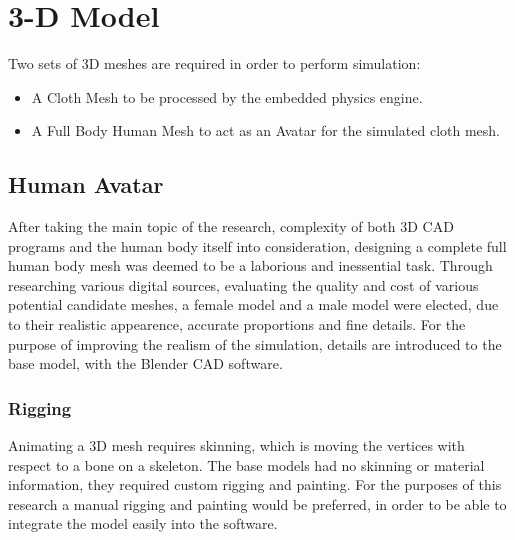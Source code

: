 \chapter{3-D Model}
\label{chapter_3d_model}

Two sets of 3D meshes are required in order to perform simulation: 
\begin{itemize}
\item A Cloth Mesh to be processed by the embedded physics engine.
\item A Full Body Human Mesh to act as an Avatar for the simulated cloth mesh.
\end{itemize}

\section{Human Avatar}
\label{section_human_avatar}



After taking the main topic of the research, complexity of both 3D CAD programs and the human body itself into consideration, 
designing a complete full human body mesh was deemed to be a laborious and inessential task. Through researching various digital sources, 
evaluating the quality and cost of various potential candidate meshes, a female\cite{Mmava2012} model and a male model\cite{Gomer2013} were elected, due to their 
realistic appearence, accurate proportions and fine details. For the purpose of improving the realism of the simulation, details are introduced to the base model,
 with the Blender CAD software\cite{Blender}.  

\subsection{Rigging}

Animating a 3D mesh requires skinning, which is moving the vertices with respect to a bone on a skeleton. The base models had no skinning or material information, they required
custom rigging and painting. For the purposes of this research a manual rigging and painting would be preferred, in order to be able to integrate the model easily into the software. 

